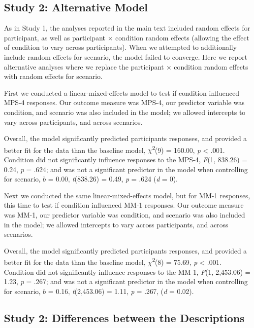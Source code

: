 \documentclass[
  man,floatsintext]{apa6}
\begin{document}
\subsection{Study 2: Alternative Model}\label{study-2-alternative-model}

As in Study 1, the analyses reported in the main text included random effects for participant, as well as participant × condition random effects (allowing the effect of condition to vary across participants). When we attempted to additionally include random effects for scenario, the model failed to converge. Here we report alternative analyses where we replace the participant × condition random effects with random effects for scenario.

First we conducted a linear-mixed-effects model to test if condition influenced MPS-4 responses. Our outcome measure was MPS-4, our predictor variable was condition, and scenario was also included in the model; we allowed intercepts to vary across participants, and across scenarios.

Overall, the model significantly predicted participants responses, and provided a better fit for the data than the baseline model, \(\chi\)\textsuperscript{2}(9) = 160.00, \emph{p} \textless{} .001. Condition did not significantly influence responses to the MPS-4, \emph{F}(1, 838.26) = 0.24, \emph{p} = .624; and was not a significant predictor in the model when controlling for scenario, \(b\) = 0.00, \emph{t}(838.26) = 0.49, \emph{p} = .624 (\emph{d} = 0).

Next we conducted the same linear-mixed-effects model, but for MM-1 responses, this time to test if condition influenced MM-1 responses. Our outcome measure was MM-1, our predictor variable was condition, and scenario was also included in the model; we allowed intercepts to vary across participants, and across scenarios.

Overall, the model significantly predicted participants responses, and provided a better fit for the data than the baseline model, \(\chi\)\textsuperscript{2}(8) = 75.69, \emph{p} \textless{} .001. Condition did not significantly influence responses to the MM-1, \emph{F}(1, 2,453.06) = 1.23, \emph{p} = .267; and was not a significant predictor in the model when controlling for scenario, \(b\) = 0.16, \emph{t}(2,453.06) = 1.11, \emph{p} = .267, (\emph{d} = 0.02).

\newpage

\subsection{Study 2: Differences between the Descriptions}\label{study-2-differences-between-the-descriptions}
\end{document}

